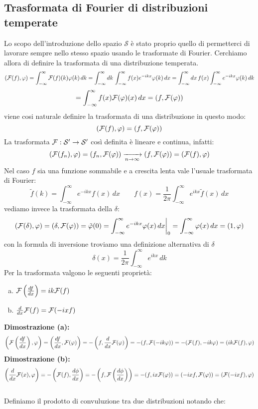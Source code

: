 \subsection{Trasformata di Fourier di distribuzioni temperate}
Lo scopo dell'introduzione dello spazio $\mathcal{S}$ è stato proprio quello di permetterci di lavorare sempre nello stesso spazio usando le trasformate di Fourier. Cerchiamo allora di definire la trasformata di una distribuzione temperata.
\[(\mathcal{F}(f),\varphi)  = \int_{-\infty}^\infty\mathcal{F}(f)(k)\varphi(k)\,dk =  \int_{-\infty}^\infty dk\, \int_{-\infty}^\infty f(x)e^{-ikx}\varphi(k)\,dx = \int_{-\infty}^\infty dx\,f(x) \int_{-\infty}^\infty e^{-ikx}\varphi(k)\,dk  \]
\[ = \int_{-\infty}^\infty f(x) \mathcal{F}(\varphi)(x)\,dx = (f,\mathcal{F}(\varphi))  \]
viene cosi naturale definire la trasformata di una distribuzione in questo modo:
\[(\mathcal{F}(f),\varphi) = (f,\mathcal{F}(\varphi))\]
La trasformata $\mathcal{F}:\mathcal{S}'\to\mathcal{S}'$ così definita è lineare e continua, infatti:
\[(\mathcal{F}(f_n),\varphi) =(f_n,\mathcal{F}(\varphi)) \xrightarrow[n\to\infty]{} (f,\mathcal{F}(\varphi)) = (\mathcal{F}(f),\varphi) \]
Nel caso $f$ sia una funzione sommabile e a crescita lenta vale l'usuale trasformata di Fourier:
\[\tilde{f}(k) = \int_{-\infty}^\infty e^{-ikx}f(x)\,dx\qquad f(x) = \frac{1}{2\pi}\int_{-\infty}^\infty e^{ikx}\tilde{f}(x)\,dx\]
vediamo invece la trasformata della $\delta$:
\[(\mathcal{F}(\delta),\varphi) = (\delta,\mathcal{F}(\varphi)) = \tilde{\varphi}(0) = \int_{-\infty}^\infty e^{-ikx}\varphi(x)\,dx \bigg|_0 = \int_{-\infty}^\infty\varphi(x)\,dx =(1,\varphi)\]
con la formula di inversione troviamo una definizione alternativa di $\delta$
\[\delta(x) = \frac{1}{2\pi}\int_{-\infty}^\infty e^{ikx}\,dk\]
Per la trasformata valgono le seguenti proprietà:
\begin{enumerate}[a)]
\item $\mathcal{F}\left(\frac{d f}{d x}\right) = ik\mathcal{F}(f)$
\item $\frac{d}{dx}\mathcal{F}(f) = \mathcal{F}(-ixf)$
\end{enumerate}
\textbf{Dimostrazione (a):}\\
\[\left(\mathcal{F}\left(\frac{d f}{d x}\right),\varphi\right) =\left(\frac{d f}{d x},\mathcal{F}(\varphi)\right) = - \left(f,\frac{d}{dx}\mathcal{F}(\varphi)\right) = -(f,\mathcal{F}(-ik\varphi)) = -(\mathcal{F}(f),-ik\varphi) = (ik\mathcal{F}(f),\varphi)\]
\textbf{Dimostrazione (b):}\\
\[\left(\frac{d }{d x}\mathcal{F}(x),\varphi\right) = - \left(\mathcal{F}(f),\frac{d \phi}{d x}\right) = - \left(f,\mathcal{F}\left(\frac{d \phi}{d x}\right)\right) = -(f,ix\mathcal{F}(\varphi)) = (-ixf,\mathcal{F}(\varphi)) = (\mathcal{F}(-ixf),\varphi)\]
\\
Definiamo il prodotto di convuluzione tra due distribuzioni notando che:
